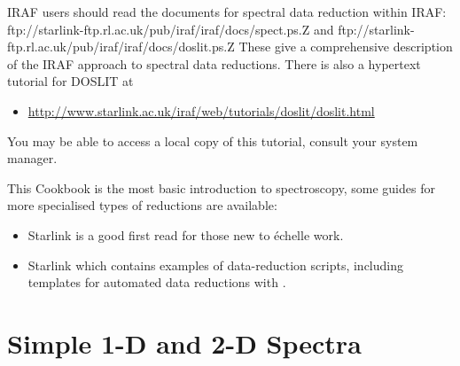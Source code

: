 \documentclass[twoside,11pt]{starlink}
\providecommand{\mlabel}[1]{\xlabel{#1}\label{#1}}
\begin{document}
IRAF users should read the documents for spectral data reduction
within IRAF:
{ftp://starlink-ftp.rl.ac.uk/pub/iraf/iraf/docs/spect.ps.Z}
and
{ftp://starlink-ftp.rl.ac.uk/pub/iraf/iraf/docs/doslit.ps.Z}
These give a comprehensive description of the IRAF approach to spectral
data reductions.  There is also a hypertext tutorial for DOSLIT at

\begin{itemize}

\item \url{http://www.starlink.ac.uk/iraf/web/tutorials/doslit/doslit.html}

\end{itemize}

You may be able to access a local copy of this tutorial, consult your
system manager.

This Cookbook is the most basic introduction to spectroscopy, some
guides for more specialised types of reductions are available:

\begin{itemize}

\item Starlink  is a good first read for those new to
\'{e}chelle work.

\item Starlink  which contains examples of
data-reduction scripts, including templates for automated data
reductions with \cite{echomop}\@.

\end{itemize}


\section{\mlabel{simple_spectrum}Simple 1-D and 2-D Spectra}
\end{document}
